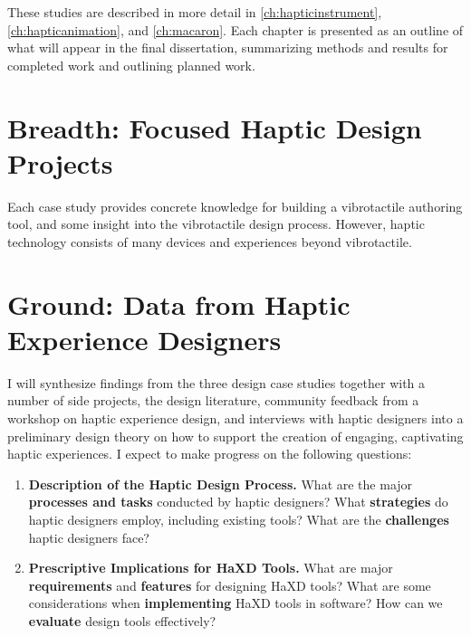 These studies are described in more detail in \autoref{ch:hapticinstrument},  \autoref{ch:hapticanimation}, and \autoref{ch:macaron}.
Each chapter is presented as an outline of what will appear in the final dissertation, summarizing methods and results for completed work and outlining planned work.


\section{Breadth: Focused Haptic Design Projects}
Each case study provides concrete knowledge for building a vibrotactile authoring tool, and some insight into the vibrotactile design process.
However, haptic technology consists of many devices and experiences beyond vibrotactile.


\section{Ground: Data from Haptic Experience Designers}
I will synthesize findings from the three design case studies together with a number of side projects, the design literature, community feedback from a workshop on haptic experience design, and interviews with haptic designers into a preliminary design theory on how to support the creation of engaging, captivating haptic experiences.
I expect to make progress on the following questions:
\begin{enumerate}
    \item \textbf{Description of the Haptic Design Process.}
    What are the major \textbf{processes and tasks} conducted by haptic designers?
    What \textbf{strategies} do haptic designers employ, including existing tools?
    What are the \textbf{challenges} haptic designers face?
    
    
    \item \textbf{Prescriptive Implications for HaXD Tools.}
    What are major \textbf{requirements} and \textbf{features} for designing HaXD tools?
    What are some considerations when \textbf{implementing} HaXD tools in software?
    How can we \textbf{evaluate} design tools effectively?
\end{enumerate}


